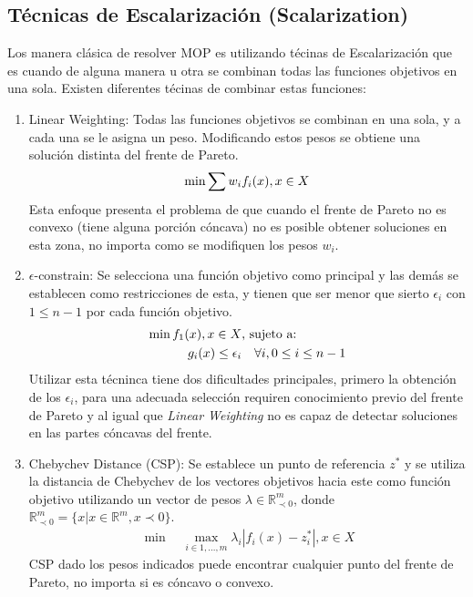 \subsection{T\'ecnicas de Escalarizaci\'on (Scalarization)}
Los manera cl\'asica de resolver MOP es utilizando t\'ecinas de Escalarizaci\'on que es cuando de alguna manera u otra se combinan todas las funciones objetivos en una sola. Existen diferentes t\'ecinas de combinar estas funciones:
\begin{enumerate}
    \item Linear Weighting: Todas las funciones objetivos se combinan en una sola, y a cada una se le asigna un peso. Modificando estos pesos se obtiene una soluci\'on distinta del frente de Pareto.
    \begin{equation*}
        \min \sum w_i f_i(x), \space x \in X
    \end{equation*}
    Esta enfoque presenta el problema de que cuando el frente de Pareto no es convexo (tiene alguna porci\'on c\'oncava) no es posible obtener soluciones en esta zona, no importa como se modifiquen los pesos $w_i$.

    \item $\epsilon$-constrain: Se selecciona una funci\'on objetivo como principal y las dem\'as se establecen como restricciones de esta, y tienen que ser menor que sierto $\epsilon_i$ con $1 \leq n - 1$ por cada funci\'on objetivo.
    \begin{align*}
            \min  f_1(x), \space x \in X  & \text{, sujeto a:}   \\
            g_i(x) \leq \epsilon_i & \quad  \forall i, 0 \leq i \leq n - 1
    \end{align*}
    Utilizar esta t\'ecninca tiene dos dificultades principales, primero la obtenci\'on de los $\epsilon_i$, para una adecuada selecci\'on requiren conocimiento previo del frente de Pareto y al igual que \textit{Linear Weighting} no es capaz de detectar soluciones en las partes c\'oncavas del frente.

\item Chebychev Distance (CSP): Se establece un punto de referencia $z^*$ y se utiliza la distancia de Chebychev de los vectores objetivos hacia este como funci\'on objetivo utilizando un vector de pesos $\lambda \in \mathbb{R}^m_{\prec 0}$, donde $\mathbb{R}^m_{\prec 0} = \{x | x \in \mathbb{R}^m, x \prec 0 \}$. 
    \begin{align*}
        \min \quad \max_{i \in {1,...,m}} \lambda_i |f_i(x) - z^*_i|, x \in X 
    \end{align*}
    CSP dado los pesos indicados puede encontrar cualquier punto del frente de Pareto, no importa si es c\'oncavo o convexo.

\end{enumerate}

